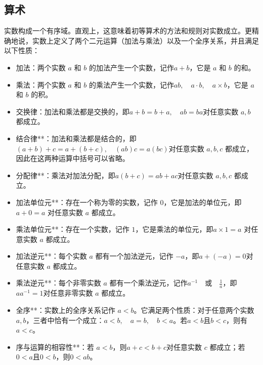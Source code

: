 \subsection{算术}
实数构成一个有序域。直观上，这意味着初等算术的方法和规则对实数成立。更精确地说，实数上定义了两个二元运算（加法与乘法）以及一个全序关系，并且满足以下性质：
\begin{itemize}
\item 加法：两个实数 $a$ 和 $b$ 的加法产生一个实数，记作$a+b$，它是 $a$ 和 $b$ 的和。
\item 乘法：两个实数 $a$ 和 $b$ 的乘法产生一个实数，记作$ab,\quad a\cdot b,\quad a\times b$，它是 $a$ 和 $b$ 的积。
\item 交换律：加法和乘法都是交换的，即$a+b=b+a,\quad ab=ba$对任意实数 $a, b$ 都成立。
\item 结合律**：加法和乘法都是结合的，即$(a+b)+c=a+(b+c),\quad (ab)c=a(bc)$对任意实数 $a, b, c$ 都成立，因此在这两种运算中括号可以省略。
\item 分配律**：乘法对加法分配，即$a(b+c)=ab+ac$对任意实数 $a, b, c$ 都成立。
\item 加法单位元**：存在一个称为零的实数，记作 $0$，它是加法的单位元，即$a+0=a$
对任意实数 $a$ 都成立。
\item 乘法单位元**：存在一个实数，记作 $1$，它是乘法的单位元，即$a\times 1=a$
对任意实数 $a$ 都成立。
\item 加法逆元**：每个实数 $a$ 都有一个加法逆元，记作 $-a$，即$a+(-a)=0$对任意实数 $a$ 都成立。
\item 乘法逆元**：每个非零实数 $a$ 都有一个乘法逆元，记作$a^{-1}\quad \text{或}\quad \tfrac{1}{a}$，即$aa^{-1}=1$对任意非零实数 $a$ 都成立。
\item 全序**：实数上的全序关系记作 $a<b$。它满足两个性质：对于任意两个实数 $a, b$，三者中恰有一个成立：$a<b,\quad a=b,\quad b<a$。若$a<b$且$b<c$，则有 $a<c$。
\item 序与运算的相容性**：若 $a<b$，则$a+c<b+c$对任意实数 $c$ 都成立；若 $0<a$且$0<b$，则$0<ab$。
\end{itemize}